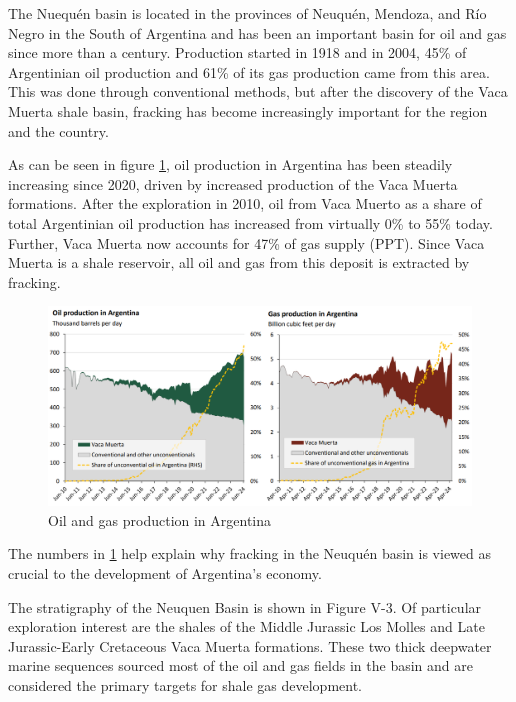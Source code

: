The Nuequén basin is located in the provinces of Neuquén, Mendoza, and Río Negro in the South of Argentina and has been an important basin for oil and gas since more than a century. Production started in 1918 and in 2004, 45\% of Argentinian oil production and 61\% of its gas production came from this area. This was done through conventional methods, but after the discovery of the Vaca Muerta shale basin, fracking has become increasingly important for the region and the country.

As can be seen in figure \ref{fig:oilgasprod}, oil production in Argentina has been steadily increasing since 2020, driven by increased production of the Vaca Muerta formations. After the exploration in 2010, oil from Vaca Muerto as a share of total Argentinian oil production has increased from virtually 0\% to 55\% today. Further, Vaca Muerta now accounts for 47\% of gas supply (PPT). Since Vaca Muerta is a shale reservoir, all oil and gas from this deposit is extracted by fracking.

\begin{figure}
    \centering
    \includegraphics[width=1\linewidth]{figures/ch9/oilgasproduction.png}
    \caption{Oil and gas production in Argentina}
    \label{fig:oilgasprod}
\end{figure}

The numbers in \ref{fig:oilgasprod} help explain why fracking in the Neuquén basin is viewed as crucial to the development of Argentina's economy.



The stratigraphy of the Neuquen Basin is shown in Figure V-3. Of particular exploration
interest are the shales of the Middle Jurassic Los Molles and Late Jurassic-Early Cretaceous
Vaca Muerta formations. These two thick deepwater marine sequences sourced most of the oil
and gas fields in the basin and are considered the primary targets for shale gas development.


